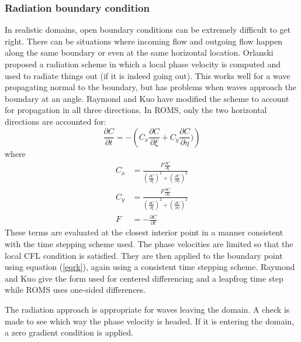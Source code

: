 \subsubsection{Radiation boundary condition}
In realistic domains, open boundary conditions can be extremely
difficult to get right. There can be situations where incoming flow and
outgoing flow happen along the same boundary or even at the same
horizontal location. Orlanski \cite{Orlanski76} proposed a radiation
scheme in which a local phase velocity is computed and used to radiate
things out (if it is indeed going out). This works well for a wave
propagating normal to the boundary, but has problems when waves
approach the boundary at an angle. Raymond and Kuo \cite{Raymond84}
have modified the scheme to account for propagation in all three
directions. In ROMS, only the two horizontal directions are accounted
for:
\begin{equation}
   \frac{\partial C}{\partial t} = - \left( C_x \frac{\partial
   C}{\partial \xi} + C_y \frac{\partial C}{\partial \eta}) \right)
\label{eqrk}
\end{equation}
where
\begin{align}
   C_x & = \frac{F \frac{\partial C}{\partial \xi}}{
   \left( \frac{\partial C}{\partial \xi} \right)^2 +
   \left( \frac{\partial C}{\partial \eta} \right)^2 } \\
   C_y & = \frac{F \frac{\partial C}{\partial \eta}}{
   \left( \frac{\partial C}{\partial \xi} \right)^2 +
   \left( \frac{\partial C}{\partial \eta} \right)^2 } \\
   F & = - \frac{\partial C}{\partial t}
\end{align}
These terms are evaluated at the closest interior point in a manner
consistent with the time stepping scheme used. The phase velocities are
limited so that the local CFL condition is satisfied. They are then
applied to the boundary point using equation (\ref{eqrk}), again using
a consistent time stepping scheme. Raymond and Kuo give the form used
for centered differencing and a leapfrog time step while ROMS uses
one-sided differences.

The radiation approach is appropriate for waves leaving the domain. A
check is made to see which way the phase velocity is headed. If it is
entering the domain, a zero gradient condition is applied.
